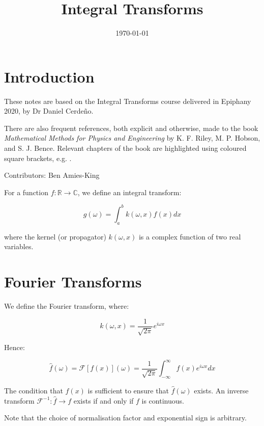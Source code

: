\documentclass{physics_notes}
\title{Integral Transforms}
\date{\today}
\begin{document}
\maketitle
\tableofcontents
\newpage

\section*{Introduction}

These notes are based on the Integral Transforms course delivered in Epiphany 2020, by Dr Daniel Cerdeño. 

There are also frequent references, both explicit and otherwise, made to the book \emph{Mathematical Methods for Physics and Engineering} by K. F. Riley, M. P. Hobson, and S. J. Bence. Relevant chapters of the book are highlighted using coloured square brackets, e.g. .

Contributors: Ben Amies-King

For a function $f: \mathbb{R} \rightarrow \mathbb{C}$, we define an integral transform:

\begin{equation}
g(\omega) = \int_a^b k(\omega, x) f(x) dx
\end{equation}

where the kernel (or propagator) $k(\omega, x)$ is a complex function of two real variables. 

\section{Fourier Transforms}

We define the Fourier transform, where:

\begin{equation*}
k(\omega, x) = \frac{1}{\sqrt{2\pi}} e^{i\omega x}
\end{equation*}

Hence:

\begin{equation}
\hat{f}(\omega) = \mathcal{F}[f(x)](\omega) = \frac{1}{\sqrt{2\pi}}\int_{-\infty}^\infty f(x) e^{i\omega x} dx
\end{equation}

The condition that $f(x)$ is sufficient to ensure that $\hat{f}(\omega)$ exists. An inverse transform $\mathcal{F}^{-1}: \hat{f} \rightarrow f$ exists if and only if $f$ is continuous. 

Note that the choice of normalisation factor and exponential sign is arbitrary. 
\end{document}
